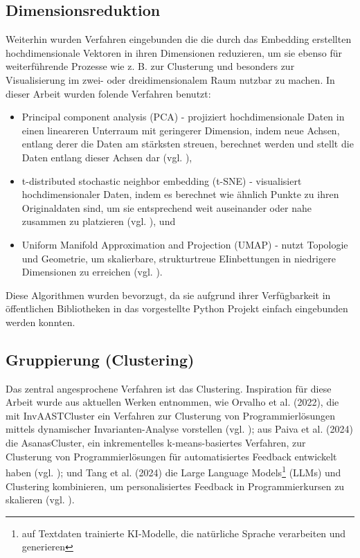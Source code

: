 \subsection{Dimensionsreduktion}
Weiterhin wurden Verfahren eingebunden die die durch das Embedding erstellten  hochdimensionale Vektoren in ihren Dimensionen reduzieren, um sie ebenso für weiterführende Prozesse wie z. B. zur Clusterung und besonders zur Visualisierung im zwei- oder dreidimensionalem Raum nutzbar zu machen. In dieser Arbeit wurden folende Verfahren benutzt:
\begin{itemize}
    \item Principal component analysis (PCA) - projiziert hochdimensionale Daten in einen lineareren Unterraum mit geringerer Dimension, indem neue Achsen, entlang derer die Daten am stärksten streuen, berechnet werden und stellt die Daten entlang dieser Achsen dar (vgl. \cite{KarlPearson.1901}),
    \item t-distributed stochastic neighbor embedding (t-SNE) - visualisiert hochdimensionaler Daten, indem es berechnet wie ähnlich Punkte zu ihren Originaldaten sind, um sie entsprechend weit auseinander oder nahe zusammen zu platzieren (vgl. \cite{LaurensvanderMaatenundGeoffreyHinton.2008}), und
    \item Uniform Manifold Approximation and Projection (UMAP) - nutzt Topologie und Geometrie, um skalierbare, strukturtreue EIinbettungen in niedrigere Dimensionen zu erreichen (vgl. \cite{McInnes.09.02.2018}).
\end{itemize}
Diese Algorithmen wurden bevorzugt, da sie aufgrund ihrer Verfügbarkeit in öffentlichen Bibliotheken in das vorgestellte Python Projekt einfach eingebunden werden konnten.

\subsection{Gruppierung (Clustering)}
Das zentral angesprochene Verfahren ist das Clustering. Inspiration für diese Arbeit wurde aus aktuellen Werken entnommen, wie Orvalho et al. (2022), die mit InvAASTCluster ein Verfahren zur Clusterung von Programmierlösungen mittels dynamischer Invarianten-Analyse vorstellen (vgl. \cite{Orvalho.28.06.2022}); aus Paiva et al. (2024) die AsanasCluster, ein inkrementelles k-means-basiertes Verfahren, zur Clusterung von Programmierlösungen für automatisiertes Feedback entwickelt haben (vgl. \cite{Paiva.2024}); und Tang et al. (2024) die Large Language Models\footnote{auf Textdaten trainierte KI-Modelle, die natürliche Sprache verarbeiten und generieren} (LLMs) und Clustering kombinieren, um personalisiertes Feedback in Programmierkursen zu skalieren (vgl. \cite{Tang.21.10.2024}).

